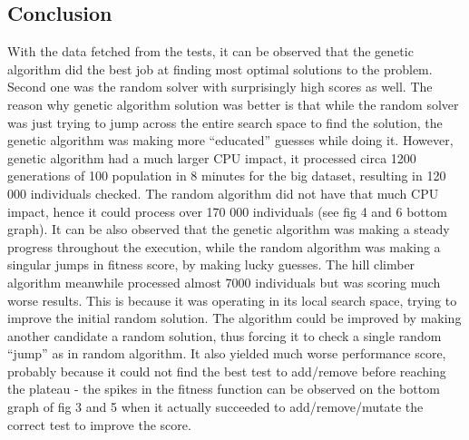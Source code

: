 \documentclass[12pt]{article}
\begin{document}
\subsection{Conclusion}

With the data fetched from the tests, it can be observed that the genetic algorithm did the best job at finding most optimal solutions to the problem. Second one was the random solver with surprisingly high scores as well. The reason why genetic algorithm solution was better is that while the random solver was just trying to jump across the entire search space to find the solution, the genetic algorithm was making more “educated” guesses while doing it. However, genetic algorithm had a much larger CPU impact, it processed circa 1200 generations of 100 population in 8 minutes for the big dataset, resulting in 120 000 individuals checked. The random algorithm did not have that much CPU impact, hence it could process over 170 000 individuals (see fig 4 and 6 bottom graph). It can be also observed that the genetic algorithm was making a steady progress throughout the execution, while the random algorithm was making a singular jumps in fitness score, by making lucky guesses. The hill climber algorithm meanwhile processed almost 7000 individuals but was scoring much worse results. This is because it was operating in its local search space, trying to improve the initial random solution. The algorithm could be improved by making another candidate a random solution, thus forcing it to check a single random “jump” as in random algorithm. It also yielded much worse performance score, probably because it could not find the best test to add/remove before reaching the plateau - the spikes in the fitness function can be observed on the bottom graph of fig 3 and 5 when it actually succeeded to add/remove/mutate the correct test to improve the score.
\end{document}
